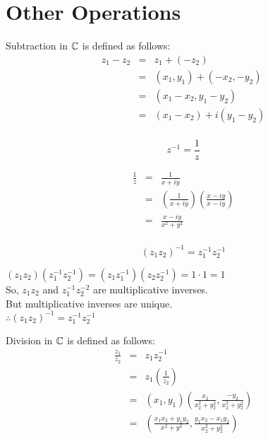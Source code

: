 \documentclass[letterpaper,12pt,fleqn]{article}
\begin{document}
\section*{Other Operations}
\begin{definition}
Subtraction in $\mathbb{C}$ is defined as follows:
\begin{eqnarray*}
z_1-z_2 &=& z_1+(-z_2) \\
    &=& (x_1,y_1)+(-x_2,-y_2) \\
    &=& (x_1-x_2,y_1-y_2) \\
    &=& (x_1-x_2)+i(y_1-y_2) \\
\end{eqnarray*}
\end{definition}

\begin{theorem}
\[z^{-1}=\frac{1}{z}\]
\end{theorem}

\begin{theproof}
\begin{eqnarray*}
\frac{1}{z} &=& \frac{1}{x+iy} \\
    &=& \left(\frac{1}{x+iy}\right)\left(\frac{x-iy}{x-iy}\right) \\
    &=& \frac{x-iy}{x^2+y^2} \\
\end{eqnarray*}
\end{theproof}

\begin{theorem}
\[(z_1z_2)^{-1}=z_1^{-1}z_2^{-1}\]
\end{theorem}

\begin{theproof}
$(z_1z_2)(z_1^{-1}z_2^{-1})=(z_1z_1^{-1})(z_2z_2^{-1})=1\cdot1=1$ \\
So, $z_1z_2$ and $z_1^{-1}z_2^{-2}$ are multiplicative inverses. \\
But multiplicative inverses are unique. \\
$\therefore (z_1z_2)^{-1}=z_1^{-1}z_2^{-1}$ \\
\end{theproof}

\begin{definition}
Division in $\mathbb{C}$ is defined as follows:
\begin{eqnarray*}
\frac{z_1}{z_2} &=& z_1z_2^{-1} \\
    &=& z_1\left(\frac{1}{z_2}\right) \\
    &=& (x_1,y_1)\left(\frac{x_2}{x_2^2+y_2^2},\frac{-y_2}{x_2^2+y_2^2}\right) \\
    &=& \left(\frac{x_1x_2+y_1y_2}{x^2+y^2},
        \frac{y_1x_2-x_1y_2}{x_2^2+y_2^2}\right) \\
\end{eqnarray*}
\end{definition}
\end{document}

